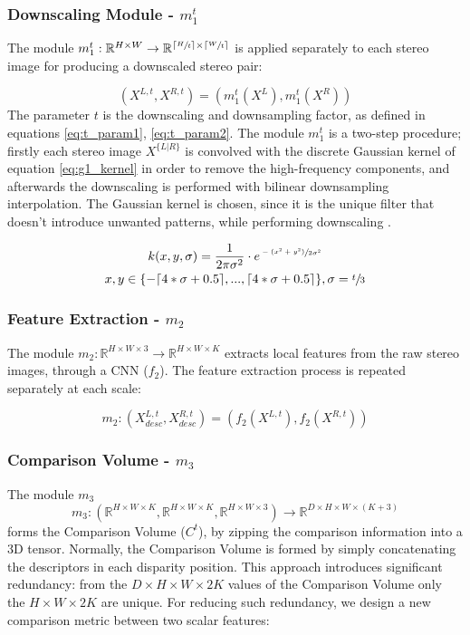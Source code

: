 \documentclass[runningheads]{llncs}
\begin{document}
\subsubsection{Downscaling Module - $m_1^t$}

The module $m_1^t: \mathbb{R}^{H \times W} \rightarrow \mathbb{R}^{\lceil \sfrac{H}{t} \rceil \times \lceil \sfrac{W}{t} \rceil }$ is applied separately to each stereo image for producing a downscaled stereo pair:

\begin{equation} \label{eq:g1}
    (X^{L,t}, X^{R,t}) = (m_1^t(X^L), m_1^t(X^R))
\end{equation}{}
%
The parameter $t$ is the downscaling and downsampling factor, as defined in equations \ref{eq:t_param1}, \ref{eq:t_param2}. The module $m_1^t$ is a two-step procedure; firstly each stereo image $X^{\{L|R\}}$ is convolved with the discrete Gaussian kernel of equation \ref{eq:g1_kernel} in order to remove the high-frequency components, and afterwards the downscaling is performed with bilinear downsampling interpolation. The Gaussian kernel is chosen, since it is the unique filter that doesn't introduce unwanted patterns, while performing downscaling \cite{Lindeberg1994}.

\begin{gather} \label{eq:g1_kernel}
    k(x, y, \sigma) = \frac{1}{2\pi\sigma^2} \cdot e^{\sfrac{-(x^2 + y^2)}{2\sigma^2}} \\
    x,y \in \{-\lceil 4*\sigma + 0.5 \rceil, ..., \lceil 4*\sigma + 0.5 \rceil\}, \sigma = \sfrac{t}{3}
\end{gather}

\subsubsection{Feature Extraction - $m_2$}

The module $m_2: \mathbb{R}^{H \times W \times 3} \rightarrow \mathbb{R}^{H \times W \times K}$ extracts local features from the raw stereo images, through a CNN ($f_2$). The feature extraction process is repeated separately at each scale:

\begin{equation} \label{eq:f_1}
    m_2:(X^{L,t}_{desc}, X^{R,t}_{desc}) = (f_2(X^{L,t}), f_2(X^{R, t}))
\end{equation} 

\subsubsection{Comparison Volume - $m_3$} The module $m_3$
$$m_3:(\mathbb{R}^{H \times W \times K}, \mathbb{R}^{H \times W \times K}, \mathbb{R}^{H \times W \times 3}) \rightarrow \mathbb{R}^{D \times H \times W \times (K+3)}$$ forms the Comparison Volume ($C^t$), by zipping the comparison information into a 3D tensor. Normally, the Comparison Volume is formed by simply concatenating the descriptors in each disparity position. This approach introduces significant redundancy: from the $D \times H \times W \times 2K$ values of the Comparison Volume only the $H \times W \times 2K$ are unique. For reducing such redundancy, we design a new comparison metric between two scalar features:
\end{document}
